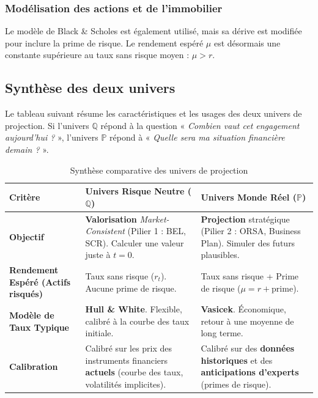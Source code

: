 \subsubsection{Modélisation des actions et de l'immobilier}
Le modèle de Black \& Scholes est également utilisé, mais sa dérive est modifiée pour inclure la prime de risque. Le rendement espéré $\mu$ est désormais une constante supérieure au taux sans risque moyen : $\mu > r$.

\subsection{Synthèse des deux univers}

Le tableau suivant résume les caractéristiques et les usages des deux univers de projection. Si l'univers $\mathbb{Q}$ répond à la question « \textit{Combien vaut cet engagement aujourd'hui ?} », l'univers $\mathbb{P}$ répond à « \textit{Quelle sera ma situation financière demain ?} ».

\begin{table}[H]
    \centering
    \caption{Synthèse comparative des univers de projection}
    \label{tab:univers_s2_comp}
    \begin{tabularx}{\textwidth}{l >{\raggedright\arraybackslash}X >{\raggedright\arraybackslash}X}
        \toprule
        \textbf{Critère} & \textbf{Univers Risque Neutre ($\mathbb{Q}$)} & \textbf{Univers Monde Réel ($\mathbb{P}$)} \\
        \midrule
        \textbf{Objectif} 
        & 
        \textbf{Valorisation} \textit{Market-Consistent} (Pilier 1 : BEL, SCR). Calculer une valeur juste à $t=0$.
        & 
        \textbf{Projection} stratégique (Pilier 2 : ORSA, Business Plan). Simuler des futurs plausibles. \\
        \addlinespace
        \textbf{Rendement Espéré (Actifs risqués)} 
        & 
        Taux sans risque ($r_t$). Aucune prime de risque.
        & 
        Taux sans risque + Prime de risque ($\mu = r + \text{prime}$). \\
        \addlinespace
        \textbf{Modèle de Taux Typique} 
        & 
        \textbf{Hull \& White}. Flexible, calibré à la courbe des taux initiale.
        & 
        \textbf{Vasicek}. Économique, retour à une moyenne de long terme. \\
        \addlinespace
        \textbf{Calibration} 
        & 
        Calibré sur les prix des instruments financiers \textbf{actuels} (courbe des taux, volatilités implicites).
        & 
        Calibré sur des \textbf{données historiques} et des \textbf{anticipations d'experts} (primes de risque). \\
        \bottomrule
    \end{tabularx}
\end{table}

